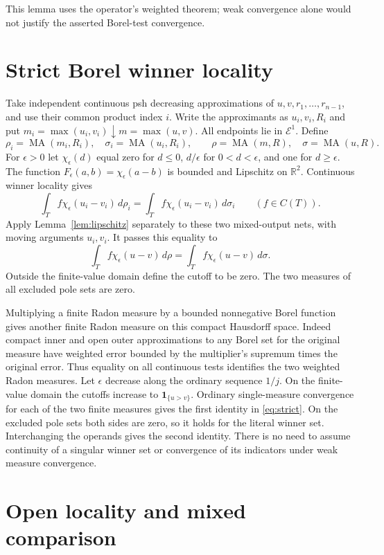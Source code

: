 \documentclass[11pt]{article}
\newcommand{\MA}{\operatorname{MA}}
\newcommand{\E}{\mathcal E}
\begin{document}
This lemma uses the operator's weighted theorem; weak convergence
alone would not justify the asserted Borel-test convergence.

\section{Strict Borel winner locality}

Take independent continuous psh decreasing approximations of
$u,v,r_1,\ldots,r_{n-1}$, and use their common product index $i$.
Write the approximants as $u_i,v_i,R_i$ and put
$m_i=\max(u_i,v_i)\downarrow m=\max(u,v)$.
All endpoints lie in $\E^1$. Define
\[
 \rho_i=\MA(m_i,R_i),\quad \sigma_i=\MA(u_i,R_i),\qquad
 \rho=\MA(m,R),\quad \sigma=\MA(u,R).
\]
For $\epsilon>0$ let $\chi_\epsilon(d)$ equal zero for $d\leq0$,
$d/\epsilon$ for $0<d<\epsilon$, and one for $d\geq\epsilon$.
The function $F_\epsilon(a,b)=\chi_\epsilon(a-b)$ is bounded and
Lipschitz on $\mathbb R^2$. Continuous winner locality gives
\[
 \int_T f\chi_\epsilon(u_i-v_i)\,d\rho_i
             =\int_T f\chi_\epsilon(u_i-v_i)\,d\sigma_i
                         \qquad(f\in C(T)).
\]
Apply Lemma~\ref{lem:lipschitz} separately to these two mixed-output
nets, with moving arguments $u_i,v_i$. It passes this equality to
\[
 \int_T f\chi_\epsilon(u-v)\,d\rho
             =\int_T f\chi_\epsilon(u-v)\,d\sigma.
\]
Outside the finite-value domain define the cutoff to be zero.
The two measures of all excluded pole sets are zero.

Multiplying a finite Radon measure by a bounded nonnegative Borel
function gives another finite Radon measure on this compact
Hausdorff space. Indeed compact inner and open outer approximations
to any Borel set for the original measure have weighted error
bounded by the multiplier's supremum times the original error.
Thus equality on all continuous tests identifies the two weighted
Radon measures. Let $\epsilon$ decrease along the ordinary sequence
$1/j$. On the finite-value domain the cutoffs increase to
$\mathbf1_{\{u>v\}}$. Ordinary single-measure convergence for each
of the two finite measures gives the first identity in
\eqref{eq:strict}. On the excluded pole sets both sides are zero,
so it holds for the literal winner set. Interchanging the operands
gives the second identity. There is no need to assume continuity of
a singular winner set or convergence of its indicators under weak
measure convergence.

\section{Open locality and mixed comparison}
\end{document}
